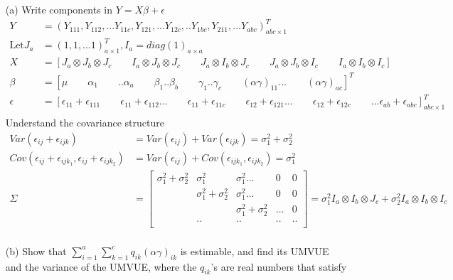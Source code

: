 \begin{itemize}
    \item [(a)] Write components in $Y= X\beta + \epsilon$\\
 \begin{align*}
Y &= (Y_{111}, Y_{112}, ... Y_{11c}, Y_{121},... Y_{12c}, ..Y_{1bc}, Y_{211}, ... Y_{abc})^T_{abc\times 1}\\
\text{Let} J_a &= (1,1,...1)^T_{a\times 1}, I_a= diag(1)_{a\times a}\\
X &= [J_a \otimes J_b \otimes J_c \qquad I_a \otimes J_b \otimes J_c \qquad J_a \otimes I_b \otimes J_c \qquad J_a \otimes J_b \otimes I_c \qquad I_a \otimes I_b \otimes I_c]\\
\beta &= [\mu \qquad \alpha_1 \qquad ..\alpha_a \qquad \beta_1.. \beta_b \qquad \gamma_1.. \gamma_c \qquad (\alpha \gamma)_{11}... \qquad (\alpha \gamma)_{ac}]^T\\
\epsilon &= [\epsilon_{11} + \epsilon_{111} \qquad \epsilon_{11}+\epsilon_{112} ... \qquad \epsilon_{11}+ \epsilon_{11c} \qquad \epsilon_{12}+\epsilon_{121} ... \qquad \epsilon_{12}+\epsilon_{12c} \qquad ... \epsilon_{ab}+\epsilon_{abc}]^T_{abc \times 1}\\
\end{align*}   
Understand the covariance structure
 \begin{align*}
Var(\epsilon_{ij} + \epsilon_{ijk}) &= Var(\epsilon_{ij}) + Var(\epsilon_{ijk}) = \sigma_1^2 + \sigma_2^2\\
Cov(\epsilon_{ij} + \epsilon_{ijk_1}, \epsilon_{ij} + \epsilon_{ijk_2 }) &= Var(\epsilon_{ij}) + Cov(\epsilon_{ijk_1}, \epsilon_{ijk_2}) = \sigma_1^2\\
\Sigma &= \begin{bmatrix}
           \sigma_1^2 + \sigma_2^2 &  \sigma_1^2 &\sigma_1^2... & 0 & 0 \\
            &  \sigma_1^2 + \sigma_2^2 & \sigma_1^2 ... &0 & 0\\
             &   & \sigma_1^2 + \sigma_2^2 & ... &0 \\
             &.. &.. &.. &..\\
         \end{bmatrix} = \sigma_1^2 I_a \otimes I_b \otimes J_c + \sigma_2^2 I_a \otimes I_b \otimes I_c\\
\end{align*} 
\item [(b)] Show that $\sum_{i=1}^{a} \sum_{k=1}^{c} q_{ik}(\alpha\gamma)_{ik}$ is estimable, and find its UMVUE and the variance of the UMVUE, where the $q_{ik}$'s are real numbers that satisfy\\

\end{itemize}
